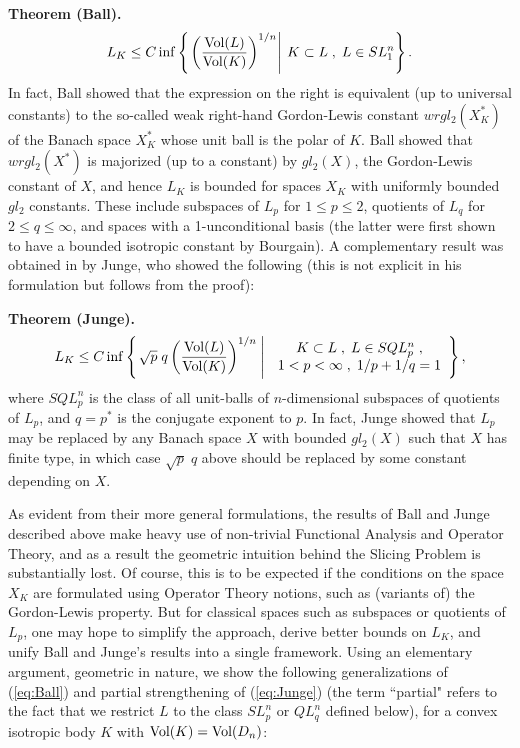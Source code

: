 \documentclass[12pt,oneside]{amsart}
\theoremstyle{definition}
\theoremstyle{remark}
\theoremstyle{proof}
\numberwithin{equation}{section}
\newcommand{\set}[1]{\left\{#1\right\}}
\newcommand{\brac}[1]{\left(#1\right)}
\newcommand{\Vol}[1]{\textnormal{Vol} (#1)}
\newcommand{\VolRatio}[2]{\brac{\frac{\Vol{#1}}{\Vol{#2}}}^{1/n}}
\begin{document}
\smallskip
\noindent\textbf{Theorem (Ball).}
\begin{equation} \label{eq:Ball}
L_K \leq C \inf \set{ \left . \VolRatio{L}{K} \right | \: K
\subset L \; , \; L \in SL_1^n}.
\end{equation}
In fact, Ball showed that the expression on the right is
equivalent (up to universal constants) to the so-called weak
right-hand Gordon-Lewis constant $wrgl_2(X^*_K)$ of the Banach
space $X^*_K$ whose unit ball is the polar of $K$. Ball showed
that $wrgl_2(X^*)$ is majorized (up to a constant) by $gl_2(X)$,
the Gordon-Lewis constant of $X$, and hence $L_K$ is bounded for
spaces $X_K$ with uniformly bounded $gl_2$ constants. These
include subspaces of $L_p$ for $1\leq p \leq 2$, quotients of
$L_q$ for $2\leq q \leq \infty$, and spaces with a
1-unconditional basis (the latter were first shown to have a
bounded isotropic constant by Bourgain). A complementary result
was obtained in \cite{Junge-slicing-problem-for-quotients-of-Lp}
by Junge, who showed the following (this is not explicit in his
formulation but follows from the proof):

\smallskip
\noindent\textbf{Theorem (Junge). }
\begin{equation} \label{eq:Junge}
L_K \leq C \inf \set{ \left . \sqrt{p} \; q \VolRatio{L}{K} \:
\right
| \; \begin{array}{c} K \subset L \; , \; L \in SQL_p^n \; , \\
1<p<\infty \; , \; 1/p + 1/q = 1 \end{array} },
\end{equation}
where $SQL_p^n$ is the class of all unit-balls of $n$-dimensional
subspaces of quotients of $L_p$, and $q = p^*$ is the conjugate
exponent to $p$. In fact, Junge showed that $L_p$ may be replaced
by any Banach space $X$ with bounded $gl_2(X)$ such that $X$ has
finite type, in which case $\sqrt{p} \; q$ above should be
replaced by some constant depending on $X$.

\medskip
As evident from their more general formulations, the results of
Ball and Junge described above make heavy use of non-trivial
Functional Analysis and Operator Theory, and as a result the
geometric intuition behind the Slicing Problem is substantially
lost. Of course, this is to be expected if the conditions on the
space $X_K$ are formulated using Operator Theory notions, such as
(variants of) the Gordon-Lewis property. But for classical spaces
such as subspaces or quotients of $L_p$, one may hope to simplify
the approach, derive better bounds on $L_K$, and unify Ball and
Junge's results into a single framework. Using an elementary
argument, geometric in nature, we show the following
generalizations of (\ref{eq:Ball}) and partial strengthening of
(\ref{eq:Junge}) (the term ``partial" refers to the fact that we
restrict $L$ to the class $SL_p^n$ or $QL_q^n$ defined below),
for a convex isotropic body $K$ with $\Vol{K} = \Vol{D_n}$:
\end{document}
